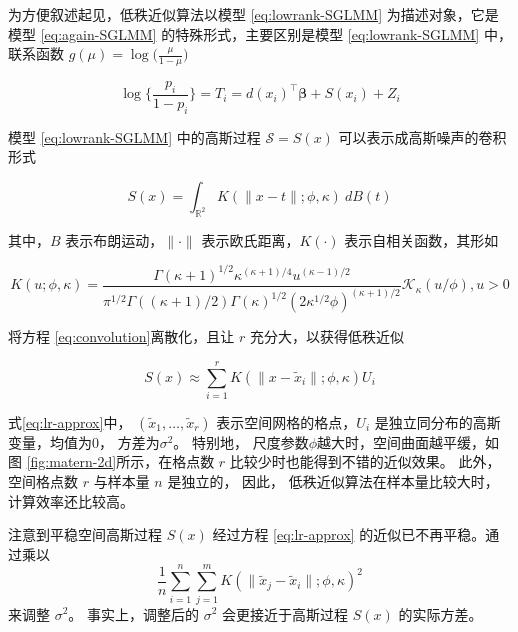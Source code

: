 \documentclass[12pt,a4paper,UTF8,twoside]{book}
\theoremstyle{definition}
\theoremstyle{definition}
\theoremstyle{definition}
\theoremstyle{remark}
\begin{document}
为方便叙述起见，低秩近似算法以模型 \eqref{eq:lowrank-SGLMM}
为描述对象，它是模型 \eqref{eq:again-SGLMM} 的特殊形式，主要区别是模型
\eqref{eq:lowrank-SGLMM} 中，联系函数
\(g(\mu) = \log\big(\frac{\mu}{1-\mu}\big)\)

\begin{equation}
\log\{\frac{p_i}{1-p_i}\}  = T_{i} = d(x_i)^{\top}\boldsymbol{\beta} + S(x_i) + Z_{i} \label{eq:lowrank-SGLMM}
\end{equation}

\noindent 模型 \eqref{eq:lowrank-SGLMM} 中的高斯过程
\(\mathcal{S} = S(x)\) 可以表示成高斯噪声的卷积形式

\begin{equation}
S(x) = \int_{\mathbb{R}^2} K(\|x-t\|; \phi, \kappa) \: d B(t) \label{eq:convolution}
\end{equation}

\noindent 其中，\(B\) 表示布朗运动，\(\|\cdot\|\)
表示欧氏距离，\(K(\cdot)\) 表示自相关函数，其形如

\begin{equation}
K(u; \phi, \kappa) = \frac{\Gamma(\kappa + 1)^{1/2}\kappa^{(\kappa+1)/4}u^{(\kappa-1)/2}}{\pi^{1/2}\Gamma((\kappa+1)/2)\Gamma(\kappa)^{1/2}(2\kappa^{1/2}\phi)^{(\kappa+1)/2}}\mathcal{K}_{\kappa}(u/\phi), u > 0 \label{eq:matern-kernel}
\end{equation}

\noindent 将方程 \eqref{eq:convolution}离散化，且让 \(r\)
充分大，以获得低秩近似 \citep{PrevMap2017JSS}

\begin{equation}
S(x) \approx \sum_{i = 1}^r K(\|x-\tilde{x}_{i}\|; \phi, \kappa) U_{i} \label{eq:lr-approx}
\end{equation}

\noindent 式\eqref{eq:lr-approx}中，
\((\tilde{x}_{1},\ldots,\tilde{x}_{r})\) 表示空间网格的格点，\(U_{i}\)
是独立同分布的高斯变量，均值为\(0\)， 方差为\(\sigma^2\)。 特别地，
尺度参数\(\phi\)越大时，空间曲面越平缓，如图
\ref{fig:matern-2d}所示，在格点数 \(r\) 比较少时也能得到不错的近似效果。
此外， 空间格点数 \(r\) 与样本量 \(n\) 是独立的， 因此，
低秩近似算法在样本量比较大时， 计算效率还比较高。

注意到平稳空间高斯过程 \(S(x)\) 经过方程 \eqref{eq:lr-approx}
的近似已不再平稳。通过乘以
\[\frac{1}{n}\sum_{i = 1}^n \sum_{j = 1}^m K(\|\tilde{x}_{j}-\tilde{x}_{i}\|; \phi, \kappa)^2\]
来调整 \(\sigma^2\)。 事实上，调整后的 \(\sigma^2\) 会更接近于高斯过程
\(S(x)\) 的实际方差。
\end{document}
